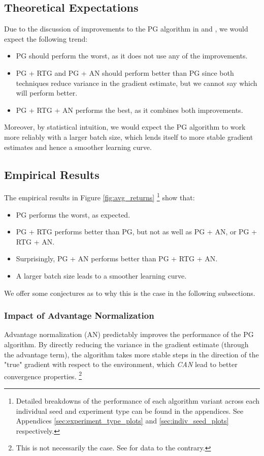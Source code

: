 \documentclass{article} %
\begin{document}
\subsection{Theoretical Expectations}
Due to the discussion of improvements to the PG algorithm in \cite{Levine-et-al-2023} and \cite{Week2},
we would expect the following trend:
\begin{itemize}
    \item PG should perform the worst, as it does not use any of the improvements.
    \item PG + RTG and PG + AN should perform better than PG since both techniques
    reduce variance in the gradient estimate, but we cannot say which will perform better.
    \item PG + RTG + AN performs the best, as it combines both improvements.
\end{itemize}

Moreover, by statistical intuition, we would expect the PG algorithm to work more reliably with a larger batch size,
which lends itself to more stable gradient estimates and hence a smoother learning curve.

\subsection{Empirical Results}
The empirical results in Figure \ref{fig:avg_returns}
\footnote{
    Detailed breakdowns of the performance of each algorithm variant
    across each individual seed and experiment type can be found in the appendices.
    See Appendices \ref{sec:experiment_type_plots} and \ref{sec:indiv_seed_plots} respectively.
} show that:
\begin{itemize}
    \item PG performs the worst, as expected.
    \item PG + RTG performs better than PG, but not as well as PG + AN, or PG + RTG + AN.
    \item Surprisingly, PG + AN performs better than PG + RTG + AN.
    \item A larger batch size leads to a smoother learning curve.
\end{itemize}

We offer some conjectures as to why this is the case in the following subsections.

\subsubsection{Impact of Advantage Normalization}
Advantage normalization (AN) predictably improves the performance of the PG algorithm.
By directly reducing the variance in the gradient estimate (through the advantage term),
the algorithm takes more stable steps in the direction of the "true" gradient with respect to the environment,
which \textit{CAN} lead to better convergence properties. 
\footnote{This is not necessarily the case. See \cite{Andrychowicz-et-al-2020} 
for data to the contrary.}
\end{document}
